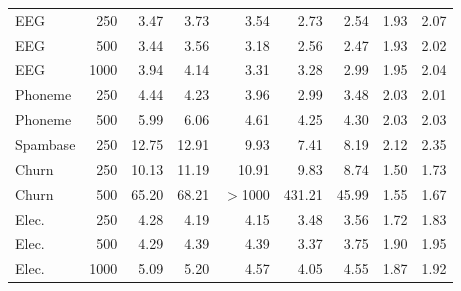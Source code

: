 \documentclass[pdflatex,sn-mathphys-num,iicol]{sn-jnl}
\theoremstyle{thmstyleone}
\theoremstyle{thmstyletwo}
\theoremstyle{thmstylethree}
\begin{document}
\begin{table}[t]
\begin{tabular}{lrrrrrrrr}
EEG & 250 & 3.47 & 3.73 & 3.54 & 2.73 & 2.54 & 1.93 & 2.07 \\
EEG & 500 & 3.44 & 3.56 & 3.18 & 2.56 & 2.47 & 1.93 & 2.02 \\
EEG & 1000 & 3.94 & 4.14 & 3.31 & 3.28 & 2.99 & 1.95 & 2.04 \\
Phoneme & 250 & 4.44 & 4.23 & 3.96 & 2.99 & 3.48 & 2.03 & 2.01 \\
Phoneme & 500 & 5.99 & 6.06 & 4.61 & 4.25 & 4.30 & 2.03 & 2.03 \\
Spambase & 250 & 12.75 & 12.91 & 9.93 & 7.41 & 8.19 & 2.12 & 2.35 \\
Churn & 250 & 10.13 & 11.19 & 10.91 & 9.83 & 8.74 & 1.50 & 1.73 \\
Churn & 500 & 65.20 & 68.21 & $>$1000 & 431.21 & 45.99 & 1.55 & 1.67 \\
Elec. & 250 & 4.28 & 4.19 & 4.15 & 3.48 & 3.56 & 1.72 & 1.83 \\
Elec. & 500 & 4.29 & 4.39 & 4.39 & 3.37 & 3.75 & 1.90 & 1.95 \\
Elec. & 1000 & 5.09 & 5.20 & 4.57 & 4.05 & 4.55 & 1.87 & 1.92 \\
\bottomrule
\end{tabular}

\end{table}
\end{document}

